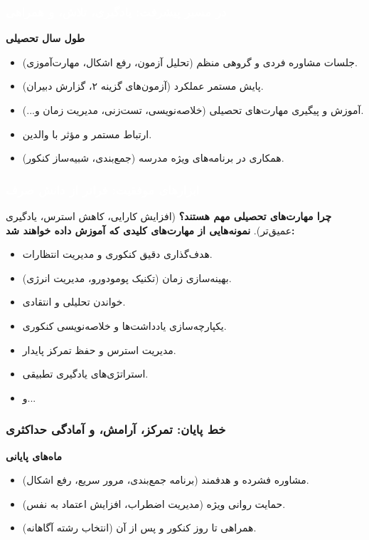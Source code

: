 \documentclass[aspectratio=169]{beamer}
\begin{document}
\begin{frame}
  \frametitle{\textcolor{white}{\textbf{در مسیر پیشرفت: یادگیری، تلاش، و همراهی}}}
  \textbf{طول سال تحصیلی}
  \begin{itemize}
    \item جلسات مشاوره فردی و گروهی منظم (تحلیل آزمون، رفع اشکال، مهارت‌آموزی).
    \item پایش مستمر عملکرد (آزمون‌های گزینه ۲، گزارش دبیران).
    \item آموزش و پیگیری مهارت‌های تحصیلی (خلاصه‌نویسی، تست‌زنی، مدیریت زمان و...).
    \item ارتباط مستمر و مؤثر با والدین.
    \item همکاری در برنامه‌های ویژه مدرسه (جمع‌بندی، شبیه‌ساز کنکور).
  \end{itemize}
\end{frame}

\begin{frame}
  \frametitle{\textcolor{white}{\textbf{ابزارهای موفقیت: فراتر از دانش صرف}}}
  \textbf{چرا مهارت‌های تحصیلی مهم هستند؟} (افزایش کارایی، کاهش استرس، یادگیری عمیق‌تر).
  \medskip
  \textbf{نمونه‌هایی از مهارت‌های کلیدی که آموزش داده خواهند شد:}
  \begin{itemize}
    \item هدف‌گذاری دقیق کنکوری و مدیریت انتظارات.
    \item بهینه‌سازی زمان (تکنیک پومودورو، مدیریت انرژی).
    \item خواندن تحلیلی و انتقادی.
    \item یکپارچه‌سازی یادداشت‌ها و خلاصه‌نویسی کنکوری.
    \item مدیریت استرس و حفظ تمرکز پایدار.
    \item استراتژی‌های یادگیری تطبیقی.
    \item و...
  \end{itemize}
\end{frame}

\begin{frame}
  \frametitle{خط پایان: تمرکز، آرامش، و آمادگی حداکثری}
  \textbf{ماه‌های پایانی}
  \begin{itemize}
    \item مشاوره فشرده و هدفمند (برنامه جمع‌بندی، مرور سریع، رفع اشکال).
    \item حمایت روانی ویژه (مدیریت اضطراب، افزایش اعتماد به نفس).
    \item همراهی تا روز کنکور و پس از آن (انتخاب رشته آگاهانه).
  \end{itemize}
\end{frame}
\end{document}

